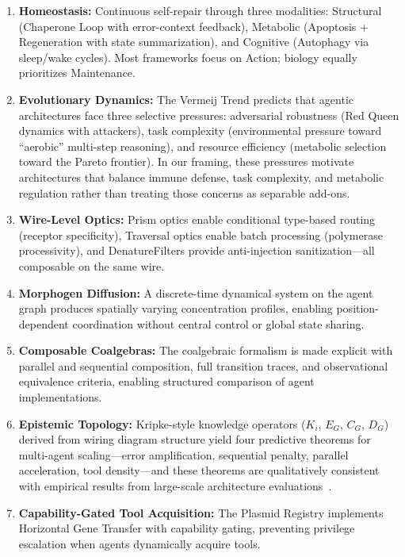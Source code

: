 \begin{enumerate}[leftmargin=*]
\item \textbf{Homeostasis:} Continuous self-repair through three modalities: Structural (Chaperone Loop with
error-context feedback), Metabolic (Apoptosis + Regeneration with state summarization), and Cognitive
(Autophagy via sleep/wake cycles). Most frameworks focus on Action; biology equally prioritizes Maintenance.

\item \textbf{Evolutionary Dynamics:} The Vermeij Trend predicts that agentic architectures face three
selective pressures: adversarial robustness (Red Queen dynamics with attackers), task complexity
(environmental pressure toward ``aerobic'' multi-step reasoning), and resource efficiency (metabolic
selection toward the Pareto frontier). In our framing, these pressures motivate architectures that balance
immune defense, task complexity, and metabolic regulation rather than treating those concerns as separable add-ons.

\item \textbf{Wire-Level Optics:} Prism optics enable conditional type-based routing (receptor specificity),
Traversal optics enable batch processing (polymerase processivity), and DenatureFilters provide
anti-injection sanitization---all composable on the same wire.

\item \textbf{Morphogen Diffusion:} A discrete-time dynamical system on the agent graph produces spatially
varying concentration profiles, enabling position-dependent coordination without central control or global
state sharing.

\item \textbf{Composable Coalgebras:} The coalgebraic formalism is made explicit with parallel and sequential
composition, full transition traces, and observational equivalence criteria, enabling structured comparison
of agent implementations.

\item \textbf{Epistemic Topology:} Kripke-style knowledge operators ($K_i$, $E_G$, $C_G$, $D_G$) derived
from wiring diagram structure yield four predictive theorems for multi-agent scaling---error amplification,
sequential penalty, parallel acceleration, tool density---and these theorems are qualitatively consistent
with empirical results from large-scale architecture evaluations~\cite{kim2025scaling}.

\item \textbf{Capability-Gated Tool Acquisition:} The Plasmid Registry implements Horizontal Gene Transfer
with capability gating, preventing privilege escalation when agents dynamically acquire tools.


\end{enumerate}
